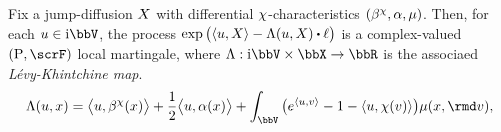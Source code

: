 \begin{proposition}
  \label{proposition:LK}
  Fix a jump-diffusion $X$ with differential $\chi$-characteristics $(\beta^\chi, \alpha, \mu)$.
  Then, for each $\momentVar \in \im\vecSpace$, the process $\exp\big(\prj{\momentVar}{\X} - \ode(\momentVar, \X) \shortInt \leb\big)$ is a complex-valued $(\Prb, \scrF)$ local martingale, where $\ode: \im\vecSpace \times \stateSpace \rightarrow \bbR$ is the associaed \emph{L\'evy-Khintchine map}.
  \begin{equation*}
    \ode(\momentVar, \stateVar) = \bprj{\momentVar}{\affDrift^\trunc(\stateVar)} + \frac12\bprj{\momentVar}{\affDiff(\stateVar)} + \int_\vecSpace \big( e^\prj{\momentVar}{\markVar} - 1 - \prj{\momentVar}{\trunc(\markVar)} \big) \affJump(\stateVar, \rmd\markVar),
  \end{equation*}
\end{proposition}
